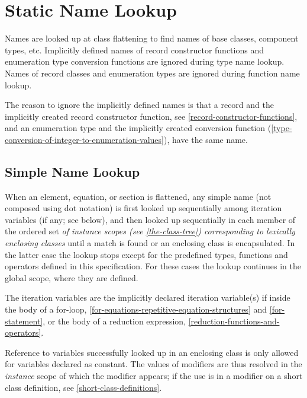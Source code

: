 \section{Static Name Lookup}\label{static-name-lookup}

Names are looked up at class flattening to find names of base classes,
component types, etc. Implicitly defined names of record constructor
functions and enumeration type conversion functions are ignored during
type name lookup. Names of record classes and enumeration types are ignored during function name lookup.

\begin{nonnormative}
The reason to ignore the implicitly defined names is that a record and the implicitly created record constructor function, see \cref{record-constructor-functions},
and an enumeration type and the implicitly created conversion function (\cref{type-conversion-of-integer-to-enumeration-values}), have the same name.
\end{nonnormative}

\subsection{Simple Name Lookup}\label{simple-name-lookup}

When an element, equation, or section is flattened, any simple name
(not composed using dot notation) is first looked up sequentially among
iteration variables (if any; see below), and then looked up sequentially in each
member of the ordered set \emph{of instance scopes (see
\cref{the-class-tree}) corresponding to lexically enclosing classes} until a
match is found or an enclosing class is encapsulated. In the latter case
the lookup stops except for the predefined types, functions and
operators defined in this specification. For these cases the lookup continues in the global scope, where they are defined.

The iteration variables are the implicitly declared iteration variable(s) if inside
the body of a for-loop, \cref{for-equations-repetitive-equation-structures} and \cref{for-statement},
or the body of a reduction expression, \cref{reduction-functions-and-operators}.

Reference to variables successfully looked up in an enclosing class is
only allowed for variables declared as constant. The values of modifiers
are thus resolved in the \emph{instance} scope of which the modifier
appears; if the use is in a modifier on a short class definition, see \cref{short-class-definitions}.

